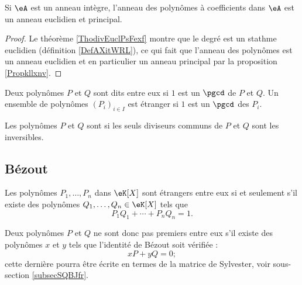 \begin{corollary}
    Si \( \eA\) est un anneau intègre, l'anneau des polynômes à coefficients dans \( \eA\) est un anneau euclidien et principal.
\end{corollary}

\begin{proof}
    Le théorème \ref{ThodivEuclPsFexf} montre que le degré est un stathme euclidien (définition \ref{DefAXitWRL}), ce qui fait que l'anneau des polynômes est un anneau euclidien et en particulier un anneau principal par la proposition \ref{Propkllxnv}. 
\end{proof}

\begin{definition}  \label{DefDSFooZVbNAX}
Deux polynômes \( P\) et \( Q\) sont dits  entre eux si \( 1\) est un \( \pgcd\) de \( P\) et \( Q\). Un ensemble de polynômes \( (P_i)_{i\in I}\) est étranger  si \( 1\) est un \( \pgcd\) des \( P_i\).
    
Les polynômes \( P\) et \( Q\) sont  si les seuls diviseurs communs de \( P\) et \( Q\) sont les inversibles.
\end{definition}

\subsection{Bézout}

\begin{theorem}[Bézout] \label{ThoBezoutOuGmLB}     
    Les polynômes \( P_1,\ldots,P_n\) dans \( \eK[X]\) sont étrangers entre eux si et seulement s'il existe des polynômes \( Q_1,\ldots,Q_n\in\eK[X]\) tels que
    \begin{equation}
        P_1Q_1+\cdots+P_nQ_n=1.
    \end{equation}
\end{theorem}

Deux polynômes \( P\) et \( Q\) ne sont donc pas premiers entre eux s'il existe des polynômes \( x\) et \( y\) tels que l'identité de Bézout soit vérifiée :
\begin{equation}    \label{EqkbbzAi}
    xP+yQ=0;
\end{equation}
cette dernière pourra être écrite en termes de la matrice de Sylvester, voir sous-section \ref{subsecSQBJfr}.

